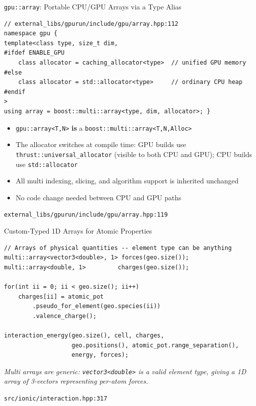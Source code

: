 \documentclass[t,aspectratio=169,handout]{beamer}
\begin{document}
\begin{frame}[fragile,label=inq2]{\texttt{gpu::array}: Portable CPU/GPU Arrays via a Type Alias}
\begin{lstlisting}
// external_libs/gpurun/include/gpu/array.hpp:112
namespace gpu {
template<class type, size_t dim,
#ifdef ENABLE_GPU
    class allocator = caching_allocator<type>  // unified GPU memory
#else
    class allocator = std::allocator<type>     // ordinary CPU heap
#endif
>
using array = boost::multi::array<type, dim, allocator>; }
\end{lstlisting}
\vspace{0.5em}
\begin{itemize}
  \item \texttt{gpu::array<T,N>} \textbf{is} a \texttt{boost::multi::array<T,N,Alloc>}
  \item The allocator switches at compile time: GPU builds use
        \texttt{thrust::universal\_allocator} (visible to both CPU and GPU);
        CPU builds use \texttt{std::allocator}
  \item All multi indexing, slicing, and algorithm support is inherited unchanged
  \item No code change needed between CPU and GPU paths
\end{itemize}

\vspace{0.3em}
\tiny\texttt{external\_libs/gpurun/include/gpu/array.hpp:119}
\end{frame}

\begin{frame}[fragile,label=inq3]{Custom-Typed 1D Arrays for Atomic Properties}
\begin{lstlisting}
// Arrays of physical quantities -- element type can be anything
multi::array<vector3<double>, 1> forces(geo.size());
multi::array<double, 1>         charges(geo.size());

for(int ii = 0; ii < geo.size(); ii++)
    charges[ii] = atomic_pot
        .pseudo_for_element(geo.species(ii))
        .valence_charge();

interaction_energy(geo.size(), cell, charges,
                   geo.positions(), atomic_pot.range_separation(),
                   energy, forces);
\end{lstlisting}
\textit{Multi arrays are generic: \texttt{vector3<double>} is a valid element type,
giving a 1D array of 3-vectors representing per-atom forces.}

\vspace{0.3em}
\tiny\texttt{src/ionic/interaction.hpp:317}
\end{frame}
\end{document}
